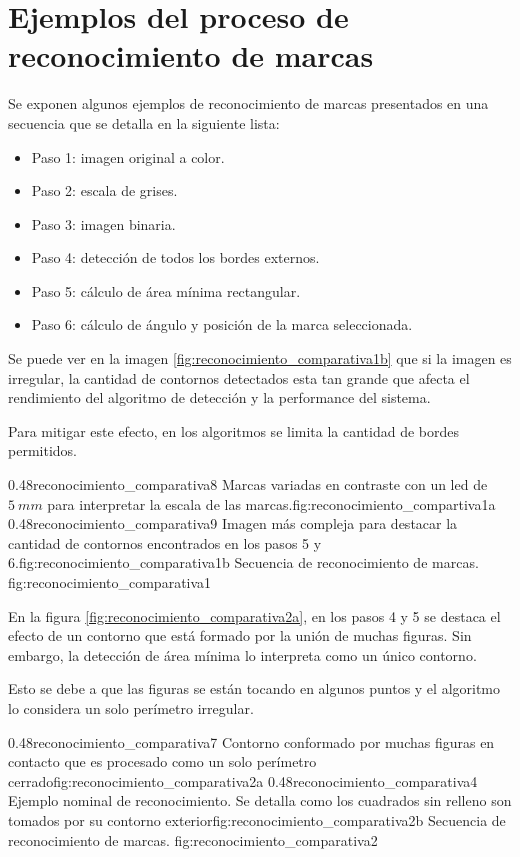 
\chapter{Ejemplos del proceso de reconocimiento de marcas} %
\label{AppendixA} %

         Se exponen algunos ejemplos de reconocimiento de marcas presentados en una secuencia que se detalla en la siguiente lista:
         \begin{itemize}
            \item{Paso 1: imagen original a color.}
            \item{Paso 2: escala de grises.}
            \item{Paso 3: imagen binaria.}
            \item{Paso 4: detección de todos los bordes externos.}
            \item{Paso 5: cálculo de área mínima rectangular.}
            \item{Paso 6: cálculo de ángulo y posición de la marca seleccionada.}
         \end{itemize}

         Se puede ver en la imagen \ref{fig:reconocimiento_comparativa1b} que si la imagen es irregular, la cantidad de contornos detectados esta tan grande que afecta el rendimiento del algoritmo de detección y la performance del sistema. \par
         Para mitigar este efecto, en los algoritmos se limita la cantidad de bordes permitidos.

\subfigab
         {0.48}{reconocimiento_comparativa8} {Marcas variadas en contraste con un led de $5\:mm$ para interpretar la escala de las marcas.}{fig:reconocimiento_compartiva1a}
         {0.48}{reconocimiento_comparativa9} {Imagen más compleja para destacar la cantidad de contornos encontrados en los pasos 5 y 6.}{fig:reconocimiento_comparativa1b}
         {Secuencia de reconocimiento de marcas.}
         {fig:reconocimiento_comparativa1}

         En la figura \ref{fig:reconocimiento_comparativa2a}, en los pasos 4 y 5 se destaca el efecto de un contorno que está formado por la unión de muchas figuras. Sin embargo, la detección de área mínima lo interpreta como un único contorno.\par Esto se debe a que las figuras se están tocando en algunos puntos y el algoritmo lo considera un solo perímetro irregular.

\subfigab
         {0.48}{reconocimiento_comparativa7} {Contorno conformado por muchas figuras en contacto que es procesado como un solo perímetro cerrado}{fig:reconocimiento_comparativa2a}
         {0.48}{reconocimiento_comparativa4} {Ejemplo nominal de reconocimiento. Se detalla como los cuadrados sin relleno son tomados por su contorno exterior}{fig:reconocimiento_comparativa2b}
         {Secuencia de reconocimiento de marcas.}
         {fig:reconocimiento_comparativa2}



